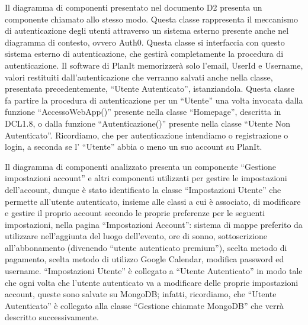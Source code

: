 \begin{listaPersonale}[DCL]{}
    Il diagramma di componenti presentato nel documento D2 presenta un componente chiamato allo stesso modo. Questa classe rappresenta il meccanismo di autenticazione degli utenti attraverso un sistema esterno presente anche nel diagramma di contesto, ovvero Auth0. Questa classe si interfaccia con questo sistema esterno di autenticazione, che gestirà completamente la procedura di autenticazione. Il software di PlanIt memorizzerà solo l'email, UserId e Username, valori restituiti dall'autenticazione che verranno salvati anche nella classe, presentata precedentemente, “Utente Autenticato”, istanziandola. Questa classe fa partire la procedura di autenticazione per un “Utente” una volta invocata dalla funzione “AccessoWebApp()” presente nella classe “Homepage”, descritta in DCL1.8, o dalla funzione “Autenticazione()” presente nella classe “Utente Non Autenticato”. Ricordiamo, che per autenticazione intendiamo o registrazione o login, a seconda se l' “Utente” abbia o meno un suo account su PlanIt.



    Il diagramma di componenti analizzato presenta un componente “Gestione impostazioni account” e altri componenti utilizzati per gestire le impostazioni dell'account, dunque è stato identificato la classe “Impostazioni Utente” che permette all'utente autenticato, insieme alle classi a cui è associato, di modificare e gestire il proprio account secondo le proprie preferenze per le seguenti impostazioni, nella pagina “Impostazioni Account”: sistema di mappe preferito da utilizzare nell'aggiunta del luogo dell'evento, ore di sonno, sottoscrizione all'abbonamento (divenendo “utente autenticato premium”), scelta metodo di pagamento, scelta metodo di utilizzo Google Calendar, modifica password ed username.
    “Impostazioni Utente” è collegato a “Utente Autenticato” in modo tale che ogni volta che l'utente autenticato va a modificare delle proprie impostazioni account, queste sono salvate su MongoDB; infatti, ricordiamo, che “Utente Autenticato” è collegato alla classe “Gestione chiamate MongoDB” che verrà descritto successivamente.

    \begin{listaPersonale2}[DCL]{}


\end{listaPersonale2}
\end{listaPersonale}
